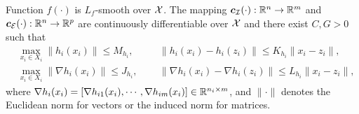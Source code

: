 \documentclass[10pt]{article}
\newcommand{\calE}{\mathcal{E}}
\newcommand{\calI}{\mathcal{I}}
\begin{document}


\begin{assumption}
    \label{Ass: boundedness of c and f} Function $f(\cdot)$ is
    $L_f$-smooth over $\mathcal{X}$. The mapping $\bc_{\calI}(\cdot): \RR^n \rightarrow \RR^m$ and $\bc_{\calE}(\cdot): \RR^n \rightarrow \RR^p$ are continuously differentiable over $\mathcal{X}$ and there exist $C, G>0$ such that 
    	\begin{subequations}\label{eq: mp c const}
		\begin{alignat}{2}
			 & \max_{x_i\in X_i}\|h_i(x_i)\|\leq  M_{h_i}, 	 \quad  && \|h_i(x_i)-h_i(z_i)\| \leq  K_{h_i}\|x_i-z_i\|,   \\
			 & \max_{x_i\in X_i}\|\nabla h_i(x_i)\| \leq  J_{h_i},  && \|\nabla h_i(x_i)-\nabla h_i(z_i)\| \leq   L_{h_i}\|x_i-z_i\|, 
		\end{alignat}
		\end{subequations}
		where $\nabla h_i(x_i) = [\nabla h_{i1}(x_i), \cdots, \nabla h_{im}(x_i)]\in \mathbb{R}^{n_i \times m}$, and $\|\cdot\|$ denotes the Euclidean norm for vectors or the induced norm for matrices.
\end{assumption}
\end{document}
